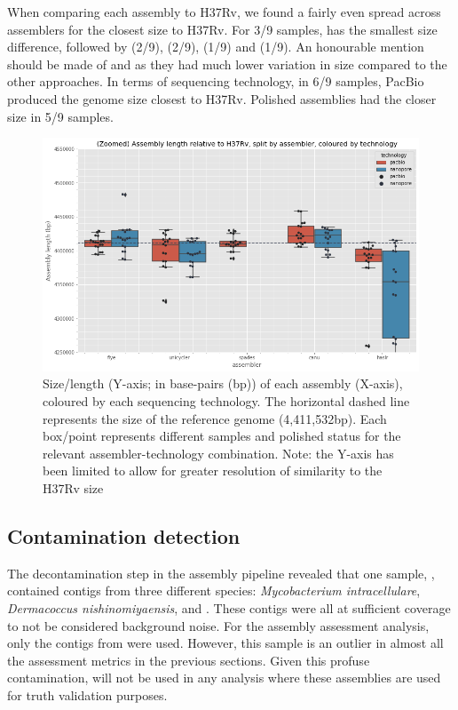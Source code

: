 When comparing each assembly to H37Rv, we found a fairly even spread across assemblers for the closest size to H37Rv. For 3/9 samples,  has the smallest size difference, followed by  (2/9),  (2/9),  (1/9) and  (1/9). An honourable mention should be made of  and  as they had much lower variation in size compared to the other approaches. In terms of sequencing technology, in 6/9 samples, PacBio produced the genome size closest to H37Rv. Polished assemblies had the closer size in 5/9 samples.

\begin{figure}
\includegraphics[width=1.0\textwidth]{Appendix1/Figs/asm_len.png}
\centering
\caption{Size/length (Y-axis; in base-pairs (bp)) of each assembly (X-axis), coloured by each sequencing technology. The horizontal dashed line represents the size of the \mtb{} reference genome (4,411,532bp). Each box/point represents different samples and polished status for the relevant assembler-technology combination. Note: the Y-axis has been limited to allow for greater resolution of similarity to the H37Rv size}
\label{fig:asm_len}
\end{figure}

\subsection{Contamination detection}

The decontamination step in the assembly pipeline revealed that one sample, , contained contigs from three different species: \textit{Mycobacterium intracellulare}, \textit{Dermacoccus nishinomiyaensis}, and \mtb{}. These contigs were all at sufficient coverage to not be considered background noise. For the assembly assessment analysis, only the contigs from \mtb{} were used. However, this sample is an outlier in almost all the assessment metrics in the previous sections. Given this profuse contamination,  will not be used in any analysis where these assemblies are used for truth validation purposes.

